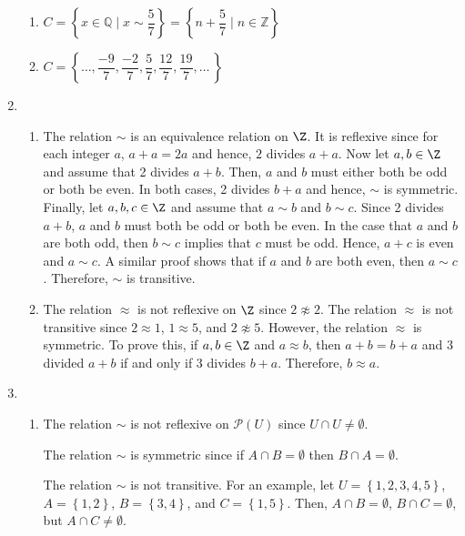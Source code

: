 \begin{enumerate}
\begin{enumerate}
\item $C = \left\{ x \in \mathbb{Q}  \mid x \sim \dfrac{5}{7} \right\} = 
\left\{ n + \dfrac{5}{7} \mid n \in \mathbb{Z} \right\}$

\item $C = \left\{ \ldots, \dfrac{-9}{7}, \dfrac{-2}{7}, \dfrac{5}{7}, \dfrac{12}{7}, \dfrac{19}{7}, \ldots \, \right\}$
\end{enumerate}



\item \begin{enumerate}
\item The relation $\sim$ is an equivalence relation on $\Z$.  It is reflexive since for each integer $a$, $a + a = 2a$ and hence, $2$ divides $a + a$.  Now let $a, b \in \Z$ and assume that 2 divides $a + b$.  Then, $a$ and $b$ must either both be odd or both be even.  In both cases, 2 divides $b + a$ and hence, $\sim$ is symmetric.  Finally, let $a, b, c \in \Z$ and assume that 
$a \sim b$ and $b \sim c$.  Since 2 divides $a + b$, $a$ and $b$ must both be odd or both be even.  In the case that $a$ and $b$ are both odd, then $b \sim c$ implies that $c$ must be odd.  Hence, $a + c$ is even and $a \sim c$.  A similar proof shows that if $a$ and $b$ are both even, then $a \sim c$.  Therefore, $\sim$ is transitive.

\item The relation $\approx$ is not reflexive on $\Z$ since $2 \not\approx 2$.  The relation $\approx$ is not transitive since $2 \approx 1$, $1 \approx 5$, and $2 \not\approx 5$.  However, the relation $\approx$ is symmetric.  To prove this, if $a, b \in \Z$ and $a \approx b$, then 
$a + b = b + a$ and 3 divided $a + b$ if and only if 3 divides $b + a$.  Therefore, $b \approx a$.
\end{enumerate}



\item \begin{enumerate}
\item The relation  $\sim$ is not reflexive on  $\mathcal{P}\left( U \right)$  since  $U \cap U \ne \emptyset $.

The relation  $\sim$ is symmetric since  if  $A \cap B = \emptyset $ then  
$B \cap A = \emptyset $.

The relation  $\sim$  is not transitive.  For an example, let  
$U = \left\{ {1, 2, 3, 4, 5} \right\}$, $A = \left\{ {1, 2} \right\}$, 
$B = \left\{ {3, 4} \right\}$, and  $C = \left\{ {1, 5} \right\}$.  Then,  
$A \cap B = \emptyset $,  $B \cap C = \emptyset $, but  $A \cap C \ne \emptyset $.


\end{enumerate}
\end{enumerate}
